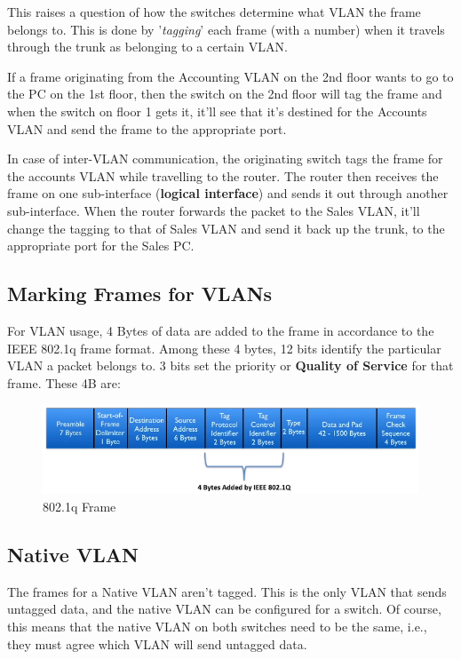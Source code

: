 \noindent
This raises a question of how the switches determine what VLAN the frame belongs to. This is done by '\textit{tagging}' each frame (with a number) when it travels through the trunk as belonging to a certain VLAN. 

If a frame originating from the Accounting VLAN on the 2nd floor wants to go to the PC on the 1st floor, then the switch on the 2nd floor will tag the frame and when the switch on floor 1 gets it, it'll see that it's destined for the Accounts VLAN and send the frame to the appropriate port. 

In case of inter-VLAN communication, the originating switch tags the frame for the accounts VLAN while travelling to the router. The router then receives the frame on one sub-interface (\textbf{logical interface}) and sends it out through another sub-interface. When the router forwards the packet to the Sales VLAN, it'll change the tagging to that of Sales VLAN and send it back up the trunk, to the appropriate port for the Sales PC. 

\subsection{Marking Frames for VLANs}
For VLAN usage, 4 Bytes of data are added to the frame in accordance to the IEEE 802.1q frame format. Among these 4 bytes, 12 bits identify the particular VLAN a packet belongs to.  3 bits set the priority or \textbf{Quality of Service} for that frame. These 4B are: 

\begin{figure}[H]
	\centering
	\includegraphics[width=1\linewidth]{"ICND1/1. Switches/chapters/3.2.b VLAN Frame"}
	\caption{802.1q Frame}
	\label{fig:3.2.b}
\end{figure}

\subsection{Native VLAN}
The frames for a Native VLAN aren't tagged. This is the only VLAN that sends untagged data, and the native VLAN can be configured for a switch. Of course, this means that the native VLAN on both switches need to be the same, i.e., they must agree which VLAN will send untagged data. 

